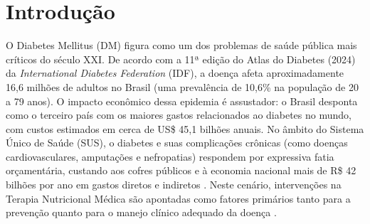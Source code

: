\documentclass[12pt, a4paper]{article}
\begin{document}
    \begin{abstract}
    O Diabetes Mellitus figura como um dos desafios mais críticos de saúde pública e de economia no século XXI. O presente trabalho tem como objetivo investigar e modelar a relação preditiva entre hábitos nutricionais, níveis de sedentarismo, antropometria e a ocorrência do diabetes em adultos brasileiros (30 a 60 anos). Utilizando o escopo da Pesquisa Nacional de Saúde (PNS) de 2019 do IBGE, aplicou-se a metodologia de Descoberta de Conhecimento em Bases de Dados (KDD). O \textit{pipeline} de processamento destacou-se pela incorporação de regras de domínio no tratamento de vazios estruturais e pela isenção de winsorização, optando-se pela preservação de \textit{outliers} clínicos genuínos através da geração de \textit{flags} isoladas. Adicionalmente, realizou-se uma robusta Engenharia de Variáveis para condensar dados esparsos em Scores clínicos de carga glicêmica, saúde mental e Índice de Massa Corporal (IMC). A base resultante, composta por 20.509 registros avaliados, revelou um perfil latente de risco, onde mais de 59\% dos sujeitos encontram-se fora da faixa de eutrofia. O estudo atesta a aderência de técnicas de Mineração de Dados na extração de padrões determinísticos complexos em grandes inquéritos de saúde populacional.

    \end{abstract}

    \newpage

    \tableofcontents

    \newpage

    \section{Introdução}
    O Diabetes Mellitus (DM) figura como um dos problemas de saúde pública mais críticos do século XXI. De acordo com a 11ª edição do Atlas do Diabetes (2024) da \textit{International Diabetes Federation} (IDF), a doença afeta aproximadamente 16,6 milhões de adultos no Brasil (uma prevalência de 10,6\% na população de 20 a 79 anos). O impacto econômico dessa epidemia é assustador: o Brasil desponta como o terceiro país com os maiores gastos relacionados ao diabetes no mundo, com custos estimados em cerca de US\$ 45,1 bilhões anuais. No âmbito do Sistema Único de Saúde (SUS), o diabetes e suas complicações crônicas (como doenças cardiovasculares, amputações e nefropatias) respondem por expressiva fatia orçamentária, custando aos cofres públicos e à economia nacional mais de R\$ 42 bilhões por ano em gastos diretos e indiretos \cite{idf2024}. Neste cenário, intervenções na Terapia Nutricional Médica são apontadas como fatores primários tanto para a prevenção quanto para o manejo clínico adequado da doença \cite{ada2004}.
\end{document}
